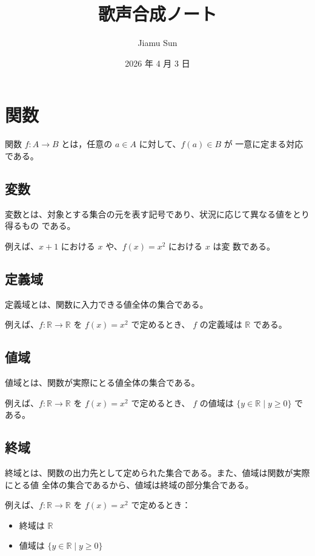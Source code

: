 \documentclass[11pt]{ltjsreport}
\title{歌声合成ノート}
\author{Jiamu Sun}
\date{2026 年 4 月 3 日}
\begin{document}
\maketitle
\tableofcontents

\setcounter{chapter}{0}
\chapter{関数}

関数 \( f : A \to B \) とは，任意の \( a \in A \) に対して、\( f(a) \in B \) が
一意に定まる対応である。

\section{変数}

変数とは、対象とする集合の元を表す記号であり、状況に応じて異なる値をとり得るもの
である。

例えば、\( x + 1 \) における \( x \) や、\( f(x) = x^2 \) における \( x \) は変
数である。

\section{定義域}

定義域とは、関数に入力できる値全体の集合である。

例えば、\( f : \mathbb{R} \to \mathbb{R} \) を \( f(x) = x^2 \) で定めるとき、
\( f \) の定義域は \( \mathbb{R} \) である。

\section{値域}

値域とは、関数が実際にとる値全体の集合である。

例えば、\( f : \mathbb{R} \to \mathbb{R} \) を \( f(x) = x^2 \) で定めるとき、
\( f \) の値域は \( \{ y \in \mathbb{R} \mid y \ge 0 \} \) である。

\section{終域}

終域とは、関数の出力先として定められた集合である。また、値域は関数が実際にとる値
全体の集合であるから、値域は終域の部分集合である。

例えば、\( f : \mathbb{R} \to \mathbb{R} \) を \( f(x) = x^2 \) で定めるとき：

\begin{itemize}
   \item 終域は \( \mathbb{R} \)
   \item 値域は \( \{ y \in \mathbb{R} \mid y \ge 0 \} \)
\end{itemize}
\end{document}

